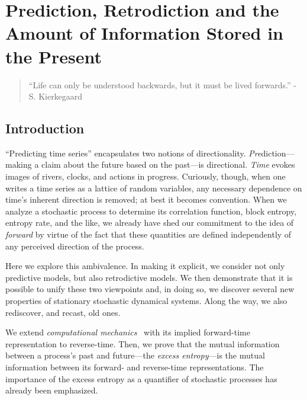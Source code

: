 \ifx\master\undefined\fi


\chapter{Prediction, Retrodiction and the Amount of Information Stored in the Present}
\label{ch:PRATISP}

\begin{quote}
``Life can only be understood backwards, but it must be lived forwards.'' - S. Kierkegaard
\end{quote}

\section{Introduction}

``Predicting time series'' encapsulates two notions of directionality.
\emph{Pre}diction---making a claim about the future based on the past---is
directional. \emph{Time} evokes images of rivers, clocks, and actions in
progress. Curiously, though, when one writes a time series as a lattice of
random variables, any necessary dependence on time's inherent direction is
removed; at best it becomes convention. When we analyze a stochastic process to
determine its correlation function, block entropy, entropy rate, and the like,
we already have shed our commitment to the idea of \emph{forward} by virtue of
the fact that these quantities are defined independently of any perceived
direction of the process.

Here we explore this ambivalence. In making it explicit, we consider not only
predictive models, but also retrodictive models. We then demonstrate that it
is possible to unify these two viewpoints and, in doing so, we discover
several new properties of stationary stochastic dynamical systems. Along the
way, we also rediscover, and recast, old ones.

We extend \emph{computational mechanics}~\cite{Crut88a,Crut98d} with its implied forward-time representation to reverse-time. Then, we prove that
the mutual information between a process's past and future---the
\emph{excess entropy}---is the mutual information between its
forward- and reverse-time representations. The importance of the excess entropy as a quantifier of stochastic processes has already been emphasized.

